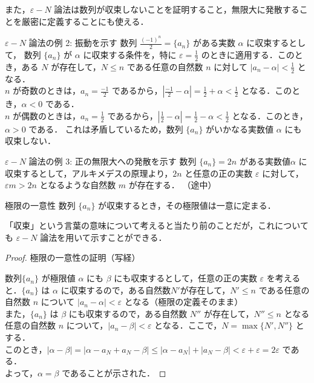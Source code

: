 \documentclass[xelatex,ja=standard,jafont=noto]{bxjsarticle}
\begin{document}
 また，$\varepsilon - N$ 論法は数列が収束しないことを証明すること，無限大に発散することを厳密に定義することにも使える．
  \begin{tcb}{$ \varepsilon - N$ 論法の例 2: 振動を示す}{}
   数列 $\frac{(-1)^n}{2} = \{a_n\}$ がある実数 $\alpha$ に収束するとして，
   数列 $\{a_n\}$ が $\alpha$ に収束する条件を，特に $\varepsilon = \frac{1}{2}$ のときに適用する．このとき，ある $N$ が存在して，$N \leq n$ である任意の自然数 $n$ に対して $|a_n - \alpha| < \frac{1}{2}$ となる．
   \\
   $n$ が奇数のときは，$a_n = \frac{-1}{2}$ であるから，$|\frac{-1}{2} - \alpha| = \frac{1}{2} + \alpha < \frac{1}{2}$ となる．このとき，$\alpha < 0$ である．
   \\
   $n$ が偶数のときは，$a_n = \frac{1}{2}$ であるから，$|\frac{1}{2} - \alpha| = \frac{1}{2} - \alpha < \frac{1}{2}$ となる．このとき，$\alpha > 0$ である．
   これは矛盾しているため，数列 $\{a_n\}$ がいかなる実数値 $\alpha$ にも収束しない．

  \end{tcb}

   \begin{tcb}{$ \varepsilon - N$ 論法の例 3: 正の無限大への発散を示す}{}
    数列 $\{a_n\} = 2n$ がある実数値$ \alpha$ に収束するとして，アルキメデスの原理より，$2n$ と任意の正の実数 $\varepsilon$ に対して，$\varepsilon m > 2n$ となるような自然数 $m$ が存在する． （途中）

   \end{tcb}

  \begin{theorem}{極限の一意性}{}
   数列 $\{a_n\}$ が収束するとき，その極限値は一意に定まる．
  \end{theorem}

「収束」という言葉の意味について考えると当たり前のことだが，これについても $\varepsilon - N$ 論法を用いて示すことができる．

\pagebreak

 \begin{proof}{極限の一意性の証明（写経）}{}

  数列$\{a_n\}$ が極限値 $\alpha$ にも $\beta$ にも収束するとして，任意の正の実数 $\varepsilon$ を考えると．$\{a_n\}$ は $\alpha$ に収束するので，ある自然数$N'$が存在して，$N' \leq n$ である任意の自然数 $n$ について $|a_n - \alpha| < \varepsilon$ となる（極限の定義そのまま）
  \\
  また，$\{a_n\}$ は $\beta$ にも収束するので，ある自然数 $N''$ が存在して，$N'' \leq  n$ となる任意の自然数 $n$ について，$|a_n - \beta| < \varepsilon$ となる．ここで，$N = \max \{ N', N''\}$ とする．
  \\
  このとき，$|\alpha - \beta| = |\alpha - a_N + a_N - \beta| \leq |\alpha - a_N| + |a_N - \beta| < \varepsilon + \varepsilon = 2\varepsilon$ である．
  \\
  よって，$\alpha = \beta$ であることが示された．

 \end{proof}
\end{document}
